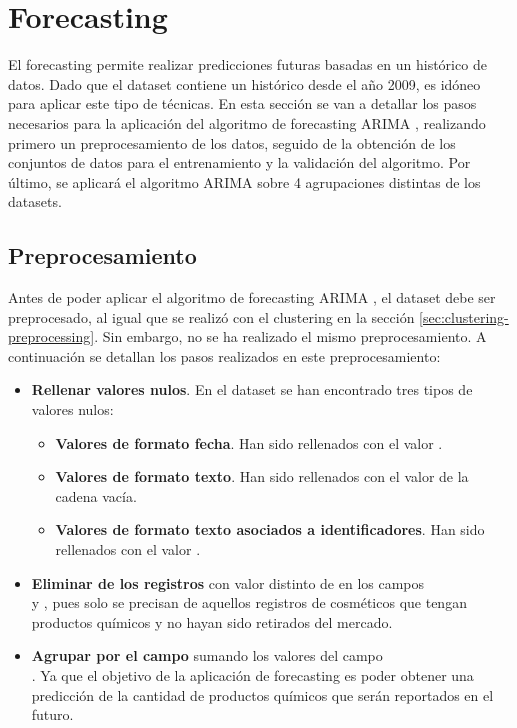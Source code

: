 
\section{Forecasting}

El forecasting permite realizar predicciones futuras basadas en un histórico de datos. Dado que el dataset \citep{dataset} contiene un histórico desde el año 2009, es idóneo para aplicar este tipo de técnicas. En esta sección se van a detallar los pasos necesarios para la aplicación del algoritmo de forecasting ARIMA \citep{arima}, realizando primero un preprocesamiento de los datos, seguido de la obtención de los conjuntos de datos para el entrenamiento y la validación del algoritmo. Por último, se aplicará el algoritmo ARIMA sobre 4 agrupaciones distintas de los datasets.



\subsection{Preprocesamiento}

Antes de poder aplicar el algoritmo de forecasting ARIMA \citep{arima}, el dataset debe ser preprocesado, al igual que se realizó con el clustering en la sección \ref{sec:clustering-preprocessing}. Sin embargo, no se ha realizado el mismo preprocesamiento. A continuación se detallan los pasos realizados en este preprocesamiento:

\begin{itemize}
 \item \textbf{Rellenar valores nulos}. En el dataset se han encontrado tres tipos de valores nulos: 
 \begin{itemize}
  \item \textbf{Valores de formato fecha}. Han sido rellenados con el valor .
  \item \textbf{Valores de formato texto}. Han sido rellenados con el valor de la cadena vacía.
  \item \textbf{Valores de formato texto asociados a identificadores}. Han sido rellenados con el valor .
 \end{itemize}
 
 \item \textbf{Eliminar de los registros} con valor distinto de  en los campos \\  y , pues solo se precisan de aquellos registros de cosméticos que tengan productos químicos y no hayan sido retirados del mercado.

 \item \textbf{Agrupar por el campo}  sumando los valores del campo \\ . Ya que el objetivo de la aplicación de forecasting es poder obtener una predicción de la cantidad de productos químicos que serán reportados en el futuro.
\end{itemize}

